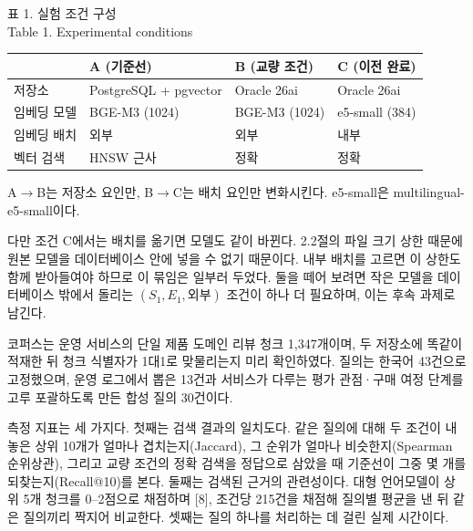 \documentclass[10pt,a4paper,twocolumn]{article}
\begin{document}
\begin{table}[t]
\centering
{\fontsize{8}{9.6}\selectfont 표 1. 실험 조건 구성\\
Table 1. Experimental conditions}
\vspace{4pt}

\fontsize{6.9}{8.1}\selectfont
\setlength{\tabcolsep}{2pt}
\renewcommand{\arraystretch}{0.95}
\begin{tabular}{@{}l>{\raggedright\arraybackslash}p{1.85cm}>{\raggedright\arraybackslash}p{1.85cm}>{\raggedright\arraybackslash}p{1.85cm}@{}}
\toprule
 & A (기준선) & B (교량 조건) & C (이전 완료) \\
\midrule
저장소 & PostgreSQL + pgvector & Oracle 26ai & Oracle 26ai \\
임베딩 모델 & BGE-M3 (1024) & BGE-M3 (1024) & e5-small (384) \\
임베딩 배치 & 외부 & 외부 & 내부 \\
벡터 검색 & HNSW 근사 & 정확 & 정확 \\
\bottomrule
\end{tabular}

\vspace{4pt}
{\fontsize{6.9}{8.1}\selectfont A$\rightarrow$B는 저장소 요인만, B$\rightarrow$C는 배치 요인만 변화시킨다. e5-small은 multilingual-e5-small이다.}
\end{table}

다만 조건 C에서는 배치를 옮기면 모델도 같이 바뀐다. 2.2절의 파일 크기 상한 때문에 원본 모델을 데이터베이스 안에 넣을 수 없기 때문이다. 내부 배치를 고르면 이 상한도 함께 받아들여야 하므로 이 묶임은 일부러 두었다. 둘을 떼어 보려면 작은 모델을 데이터베이스 밖에서 돌리는 $(S_1, E_1, \text{외부})$ 조건이 하나 더 필요하며, 이는 후속 과제로 남긴다.

코퍼스는 운영 서비스의 단일 제품 도메인 리뷰 청크 1,347개이며, 두 저장소에 똑같이 적재한 뒤 청크 식별자가 1대1로 맞물리는지 미리 확인하였다. 질의는 한국어 43건으로 고정했으며, 운영 로그에서 뽑은 13건과 서비스가 다루는 평가 관점·구매 여정 단계를 고루 포괄하도록 만든 합성 질의 30건이다.

측정 지표는 세 가지다. 첫째는 검색 결과의 일치도다. 같은 질의에 대해 두 조건이 내놓은 상위 10개가 얼마나 겹치는지(Jaccard), 그 순위가 얼마나 비슷한지(Spearman 순위상관), 그리고 교량 조건의 정확 검색을 정답으로 삼았을 때 기준선이 그중 몇 개를 되찾는지(Recall@10)를 본다. 둘째는 검색된 근거의 관련성이다. 대형 언어모델이 상위 5개 청크를 0--2점으로 채점하며 [8], 조건당 215건을 채점해 질의별 평균을 낸 뒤 같은 질의끼리 짝지어 비교한다. 셋째는 질의 하나를 처리하는 데 걸린 실제 시간이다.
\end{document}
